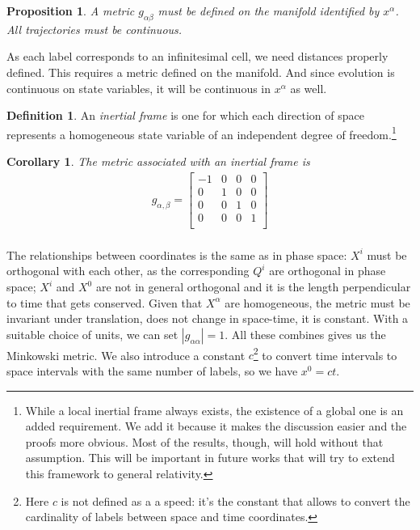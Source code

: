 \documentclass[aps,pra,10pt,twocolumn,floatfix,nofootinbib]{revtex4-1}
\newtheorem{cor}[thm]{Corollary}
\newtheorem{prop}[thm]{Proposition}
\theoremstyle{definition}
\newtheorem{defn}[thm]{Definition}
\begin{document}
\begin{prop}\label{}
A metric $g_{\alpha\beta}$ must be defined on the manifold identified by $x^\alpha$. All trajectories must be continuous.
\end{prop}

As each label corresponds to an infinitesimal cell, we need distances properly defined. This requires a metric defined on the manifold. And since evolution is continuous on state variables, it will be continuous in $x^\alpha$ as well.

\begin{defn}\label{continuousLabels}
An \emph{inertial frame} is one for which each direction of space represents a homogeneous state variable of an independent degree of freedom.\footnote{While a local inertial frame always exists, the existence of a global one is an added requirement. We add it because it makes the discussion easier and the proofs more obvious. Most of the results, though, will hold without that assumption. This will be important in future works that will try to extend this framework to general relativity.}
\end{defn}

\begin{cor}\label{continuousLabels}
The metric associated with an inertial frame is
\begin{align*}
g_{\alpha, \beta} =  \left[
  \begin{array}{cccc}
    -1 & 0 & 0 & 0 \\
    0 & 1 & 0 & 0 \\
    0 & 0 & 1 & 0 \\
    0 & 0 & 0 & 1 \\
  \end{array}
\right] \\
\end{align*}
\end{cor}

The relationships between coordinates is the same as in phase space: $X^i$ must be orthogonal with each other, as the corresponding $Q^i$ are orthogonal in phase space; $X^i$ and $X^0$ are not in general orthogonal and it is the length perpendicular to time that gets conserved. Given that $X^\alpha$ are homogeneous, the metric must be invariant under translation, does not change in space-time, it is constant. With a suitable choice of units, we can set $|g_{\alpha\alpha}|=1$. All these combines gives us the Minkowski metric. We also introduce a constant $c$\footnote{Here $c$ is not defined as a a speed: it's the constant that allows to convert the cardinality of labels between space and time coordinates.} to convert time intervals to space intervals with the same number of labels, so we have $x^0=ct$.
\end{document}
